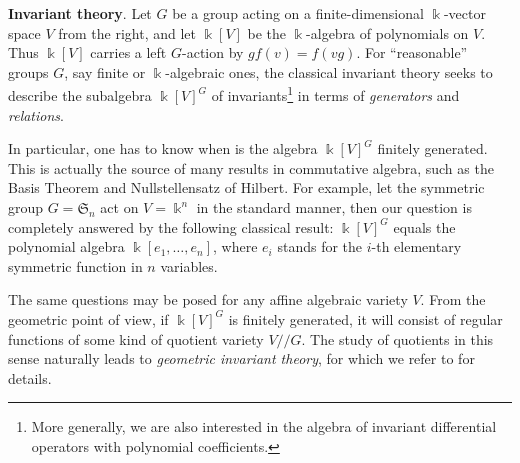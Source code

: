 \begin{asparaenum}[(A)]
	\item \textbf{Invariant theory}. Let $G$ be a group acting on a finite-dimensional $\Bbbk$-vector space $V$ from the right, and let $\Bbbk[V]$ be the $\Bbbk$-algebra of polynomials on $V$. Thus $\Bbbk[V]$ carries a left $G$-action by $gf(v) = f(vg)$. For ``reasonable'' groups $G$, say finite or $\Bbbk$-algebraic ones, the classical invariant theory seeks to describe the subalgebra $\Bbbk[V]^G$ of invariants\footnote{More generally, we are also interested in the algebra of invariant differential operators with polynomial coefficients.} in terms of \emph{generators} and \emph{relations}.

	In particular, one has to know when is the algebra $\Bbbk[V]^G$ finitely generated. This is actually the source of many results in commutative algebra, such as the Basis Theorem and Nullstellensatz of Hilbert. For example, let the symmetric group $G = \mathfrak{S}_n$ act on $V = \Bbbk^n$ in the standard manner, then our question is completely answered by the following classical result: $\Bbbk[V]^G$ equals the polynomial algebra $\Bbbk[e_1, \ldots, e_n]$, where $e_i$ stands for the $i$-th elementary symmetric function in $n$ variables.

	The same questions may be posed for any affine algebraic variety $V$. From the geometric point of view, if $\Bbbk[V]^G$ is finitely generated, it will consist of regular functions of some kind of quotient variety $V /\!/ G$. The study of quotients in this sense naturally leads to \emph{geometric invariant theory}, for which we refer to \cite{AG4} for details.
\end{asparaenum}
